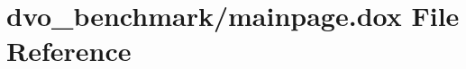 \hypertarget{dvo__benchmark_2mainpage_8dox}{}\section{dvo\+\_\+benchmark/mainpage.dox File Reference}
\label{dvo__benchmark_2mainpage_8dox}
